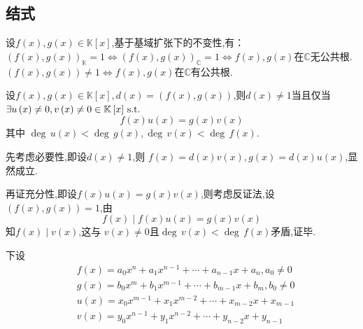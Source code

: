 \subsection{结式}
\begin{formal}
\begin{theorem}[基域扩张]\label{thm:基域扩张}
    设$f\left(x\right),g\left(x\right)\in\mathbb{K}\left[x\right]$,基于基域扩张下的不变性,有：$\left(
        f\left(x\right),g\left(x\right)
    \right)_{\mathbb{K}}=1\Longleftrightarrow
    \left(
        f\left(x\right),g\left(x\right)   
    \right)_{\mathbb{C}}=1\Longleftrightarrow
    f\left(x\right),g\left(x\right)$在$\mathbb{C}$无公共根.$\left(
        f\left(x\right),g\left(x\right)
    \right)\neq 1\Longleftrightarrow
    f\left(x\right),g\left(x\right)$在$\mathbb{C}$有公共根.
\end{theorem}
\end{formal}
\begin{green}
\begin{lemma}[公因子的存在性]\label{lem:公因子的存在性}
    设$f\left(x\right),g\left(x\right)\in\mathbb{K}\left[x\right],d\left(x\right)=\left(
        f\left(x\right),g\left(x\right)
    \right)$,则$d\left(x\right)\neq 1$当且仅当$\exists u\left(x\right)\neq 0,v\left(x\right)\neq 0\in\mathbb{K}\left[x\right]\,\textup{s.t.}$
    \[
    f\left(x\right)u\left(x\right)=g\left(x\right)v\left(x\right)
    \]其中
    $\deg \,u\left(x\right)<\deg\,g\left(x\right),\deg\,v\left(x\right)<\deg\,f\left(x\right)$.
\end{lemma}
\begin{Proof}
先考虑必要性,即设$d\left(x\right)\neq 1$,则
$f\left(x\right)=d\left(x\right)v\left(x\right),g\left(x\right)=d\left(x\right)u\left(x\right)$,显然成立.

再证充分性,即设$f\left(x\right)u\left(x\right)=g\left(x\right)v\left(x\right)$,则考虑反证法,设$\left(
    f\left(x\right),g\left(x\right)
\right)=1$,由
\[
f\left(x\right)\mid f\left(x\right)u\left(x\right)=g\left(x\right)v\left(x\right)
\]知$f\left(x\right)\mid v\left(x\right)$,这与
$v\left(x\right)\neq 0$且$\deg\,v\left(x\right)<
\deg\,f\left(x\right)$矛盾,证毕.
\end{Proof}
\end{green}
\begin{red}
\begin{remark}
    下设
    \begin{align*}
        &f\left(x\right)=a_0x^n +a_1x^{n-1}+\cdots+a_{n-1}x+a_n,a_0\neq 0\\
        &g\left(x\right)=b_0x^m+b_1x^{m-1}+\cdots+b_{m-1}x+b_m,b_0\neq 0\\
        &u\left(x\right)=x_0x^{m-1}+x_1x^{m-2}+\cdots+x_{m-2}x+x_{m-1}\\
        &v\left(x\right)=y_0x^{n-1}+y_1x^{n-2}+\cdots+y_{n-2}x+y_{n-1}
    \end{align*}
\end{remark}
\end{red}
